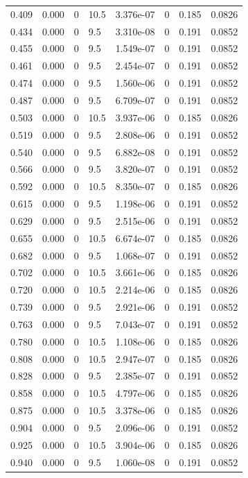 \documentclass[preview]{standalone}
\begin{document}
{{\begin{tabular}{L{1.2cm}C{1.2cm} C{0.3cm}C{0.5cm} C{1.4cm}C{1.4cm} C{1.4cm}C{1.4cm}}
  0.409  &  0.000  & 0     & 10.5 &  3.376e-07  & 0  & 0.185 &  0.0826   \\ 
  0.434  &  0.000  & 0     & 9.5 &  3.310e-08  & 0  & 0.191 &  0.0852   \\ 
  0.455  &  0.000  & 0     & 9.5 &  1.549e-07  & 0  & 0.191 &  0.0852   \\ 
  0.461  &  0.000  & 0     & 9.5 &  2.454e-07  & 0  & 0.191 &  0.0852   \\ 
  0.474  &  0.000  & 0     & 9.5 &  1.560e-06  & 0  & 0.191 &  0.0852   \\ 
  0.487  &  0.000  & 0     & 9.5 &  6.709e-07  & 0  & 0.191 &  0.0852   \\ 
  0.503  &  0.000  & 0     & 10.5 &  3.937e-06  & 0  & 0.185 &  0.0826   \\ 
  0.519  &  0.000  & 0     & 9.5 &  2.808e-06  & 0  & 0.191 &  0.0852   \\ 
  0.540  &  0.000  & 0     & 9.5 &  6.882e-08  & 0  & 0.191 &  0.0852   \\ 
  0.566  &  0.000  & 0     & 9.5 &  3.820e-07  & 0  & 0.191 &  0.0852   \\ 
  0.592  &  0.000  & 0     & 10.5 &  8.350e-07  & 0  & 0.185 &  0.0826   \\ 
  0.615  &  0.000  & 0     & 9.5 &  1.198e-06  & 0  & 0.191 &  0.0852   \\ 
  0.629  &  0.000  & 0     & 9.5 &  2.515e-06  & 0  & 0.191 &  0.0852   \\ 
  0.655  &  0.000  & 0     & 10.5 &  6.674e-07  & 0  & 0.185 &  0.0826   \\ 
  0.682  &  0.000  & 0     & 9.5 &  1.068e-07  & 0  & 0.191 &  0.0852   \\ 
  0.702  &  0.000  & 0     & 10.5 &  3.661e-06  & 0  & 0.185 &  0.0826   \\ 
  0.720  &  0.000  & 0     & 10.5 &  2.214e-06  & 0  & 0.185 &  0.0826   \\ 
  0.739  &  0.000  & 0     & 9.5 &  2.921e-06  & 0  & 0.191 &  0.0852   \\ 
  0.763  &  0.000  & 0     & 9.5 &  7.043e-07  & 0  & 0.191 &  0.0852   \\ 
  0.780  &  0.000  & 0     & 10.5 &  1.108e-06  & 0  & 0.185 &  0.0826   \\ 
  0.808  &  0.000  & 0     & 10.5 &  2.947e-07  & 0  & 0.185 &  0.0826   \\ 
  0.828  &  0.000  & 0     & 9.5 &  2.385e-07  & 0  & 0.191 &  0.0852   \\ 
  0.858  &  0.000  & 0     & 10.5 &  4.797e-06  & 0  & 0.185 &  0.0826   \\ 
  0.875  &  0.000  & 0     & 10.5 &  3.378e-06  & 0  & 0.185 &  0.0826   \\ 
  0.904  &  0.000  & 0     & 9.5 &  2.096e-06  & 0  & 0.191 &  0.0852   \\ 
  0.925  &  0.000  & 0     & 10.5 &  3.904e-06  & 0  & 0.185 &  0.0826   \\ 
  0.940  &  0.000  & 0     & 9.5 &  1.060e-08  & 0  & 0.191 &  0.0852   \\ 
\hline 
\end{tabular} 

}}
\end{document}
